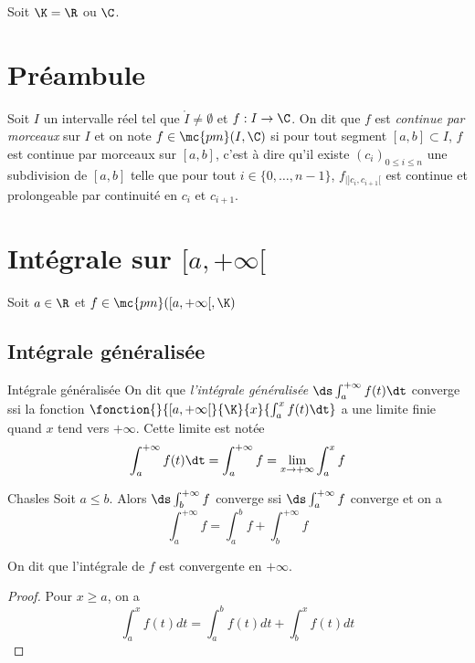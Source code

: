 Soit $\K = \R$ ou $\C$. 

\section*{Préambule}

\begin{definition}{}{}
    Soit $I$ un intervalle réel tel que $\mathring I \neq \emptyset$ et $f : I \to \C$. 
    On dit que $f$ est \textit{continue par morceaux} sur $I$ et on note $f \in \mc{pm}(I, \C)$ si pour tout segment 
    $[a, b] \subset I$, $f$ est continue par morceaux sur $[a, b]$, c'est à dire qu'il existe 
    $(c_i)_{0 \leq i \leq n}$ une subdivision de $[a, b]$ telle que pour tout $i \in \{0, \ldots, n-1\}$,
    $f_{|]c_i, c_{i+1}[}$ est continue et prolongeable par continuité en $c_i$ et $c_{i+1}$.
\end{definition}


\section{Intégrale sur \texorpdfstring{$[a, + \infty[$}{x >= a}}

Soit $a \in \R$ et $f \in \mc{pm} ([a, + \infty[, \K)$

\subsection{Intégrale généralisée }

\begin{definition}{Intégrale généralisée}{}
    On dit que \textit{l'intégrale généralisée} $\ds \int_a^{+ \infty} f(t) \dt$ converge ssi 
    la fonction $\fonction{}{[a, + \infty[}{\K}{x}{\int_a^x f(t) \dt}$ a une limite finie quand 
    $x$ tend vers $+ \infty$. Cette limite est notée 
    $$\int_a^{+ \infty} f(t) \dt = \int_{a }^{+ \infty   } f = \lim_{x \to + \infty} \int_{a }^{x } f$$
\end{definition}

\begin{proposition}{Chasles}{}
    Soit $a \leqslant b $. Alors $\ds \int_b^{+ \infty} f $ converge ssi 
    $\ds \int_a^{+ \infty} f $ converge et on a 
    $$\int_a^{+ \infty} f = \int_a^b f + \int_b^{+ \infty} f$$

    On dit que l'intégrale de $f$ est convergente en $+\infty$.
\end{proposition}

\begin{proof}
    Pour $x \geqslant a$, on a 
    $$\int_a^x f(t) dt = \int_a^b f(t) dt + \int_b^x f(t) dt$$
\end{proof}

